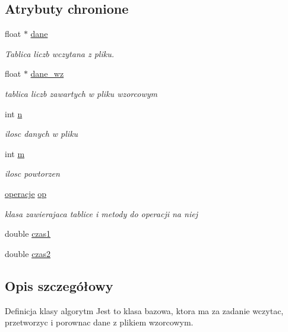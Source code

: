 \subsection*{Atrybuty chronione}
\begin{DoxyCompactItemize}
\item 
float $\ast$ \hyperlink{classalgorytm_a5dd6d510b611002cfb9737f12eeff63f}{dane}
\begin{DoxyCompactList}\small\item\em Tablica liczb wczytana z pliku. \end{DoxyCompactList}\item 
float $\ast$ \hyperlink{classalgorytm_a93fb0f7a64eb1e4f8492445395f98e5f}{dane\-\_\-wz}
\begin{DoxyCompactList}\small\item\em tablica liczb zawartych w pliku wzorcowym \end{DoxyCompactList}\item 
int \hyperlink{classalgorytm_a2778c37f0ec06a30b7d494501c40e91a}{n}
\begin{DoxyCompactList}\small\item\em ilosc danych w pliku \end{DoxyCompactList}\item 
int \hyperlink{classalgorytm_ac9429e88b0630a008df4d011458ee5a2}{m}
\begin{DoxyCompactList}\small\item\em ilosc powtorzen \end{DoxyCompactList}\item 
\hyperlink{classoperacje}{operacje} \hyperlink{classalgorytm_aedaee1aa41206b5f050fe660d0846f2d}{op}
\begin{DoxyCompactList}\small\item\em klasa zawierajaca tablice i metody do operacji na niej \end{DoxyCompactList}\item 
double \hyperlink{classalgorytm_a4dae8e390930e55b11f9e0f4efd9edaf}{czas1}
\item 
double \hyperlink{classalgorytm_abf8a655cd9b1acea00ba90893d38567b}{czas2}
\end{DoxyCompactItemize}


\subsection{Opis szczegółowy}
Definicja klasy algorytm Jest to klasa bazowa, ktora ma za zadanie wczytac, przetworzyc i porownac dane z plikiem wzorcowym. 

